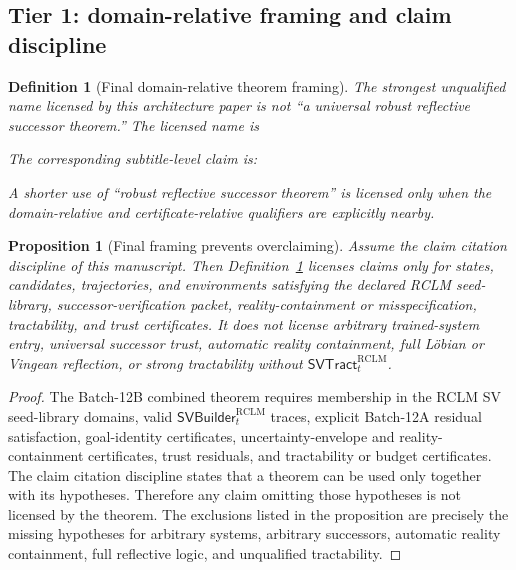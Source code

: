 \documentclass[11pt,a4paper]{article}
\newtheorem{proposition}[theorem]{Proposition}
\newtheorem{definition}[theorem]{Definition}
\newcommand{\RCLM}{\mathrm{RCLM}}
\begin{document}
\subsection{Tier 1: domain-relative framing and claim discipline}

\begin{definition}[Final domain-relative theorem framing]
\label{def:rclm-final-domain-relative-framing}
The strongest unqualified name licensed by this architecture paper is not ``a universal robust reflective successor theorem.''  The licensed name is
\begin{center}
\end{center}
The corresponding subtitle-level claim is:
\begin{center}
\end{center}
A shorter use of ``robust reflective successor theorem'' is licensed only when the domain-relative and certificate-relative qualifiers are explicitly nearby.
\end{definition}

\begin{proposition}[Final framing prevents overclaiming]
\label{prop:rclm-final-framing-prevents-overclaiming}
Assume the claim citation discipline of this manuscript.  Then Definition~\ref{def:rclm-final-domain-relative-framing} licenses claims only for states, candidates, trajectories, and environments satisfying the declared RCLM seed-library, successor-verification packet, reality-containment or misspecification, tractability, and trust certificates.  It does not license arbitrary trained-system entry, universal successor trust, automatic reality containment, full L\"obian or Vingean reflection, or strong tractability without \(\mathsf{SVTract}_t^{\RCLM}\).
\end{proposition}

\begin{proof}
The Batch-12B combined theorem requires membership in the RCLM SV seed-library domains, valid \(\mathsf{SVBuilder}_t^{\RCLM}\) traces, explicit Batch-12A residual satisfaction, goal-identity certificates, uncertainty-envelope and reality-containment certificates, trust residuals, and tractability or budget certificates.  The claim citation discipline states that a theorem can be used only together with its hypotheses.  Therefore any claim omitting those hypotheses is not licensed by the theorem.  The exclusions listed in the proposition are precisely the missing hypotheses for arbitrary systems, arbitrary successors, automatic reality containment, full reflective logic, and unqualified tractability.
\end{proof}
\end{document}
